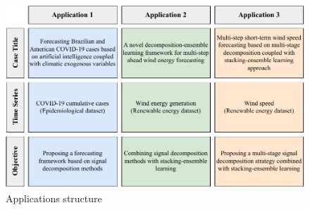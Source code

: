 \begin{figure}[htb!]
    \centering
    \includegraphics[width=\linewidth]{Media/case_studies.pdf}
    \caption{Applications structure}
    \label{fig:case_studies}
\end{figure}


\newpage


\newpage


\newpage


